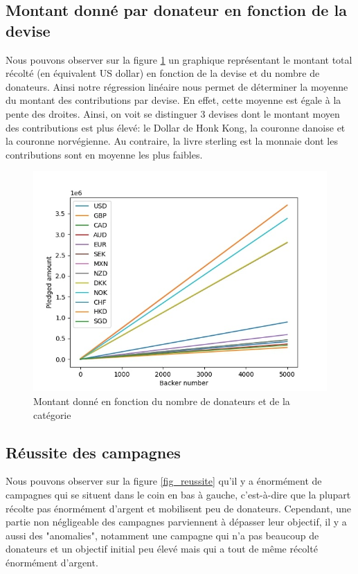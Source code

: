 \documentclass{article}
\begin{document}
\subsection{Montant donné par donateur en fonction de la devise}
\label{categorie}
\tabto{1cm} Nous pouvons observer sur la figure \ref{fig_devise} un graphique représentant le montant total récolté (en équivalent US dollar) en fonction de la devise et du nombre de donateurs. 
Ainsi notre régression linéaire nous permet de déterminer la moyenne du montant des contributions par devise. En effet, cette moyenne est égale à la pente des droites. Ainsi, on voit se distinguer 3 devises dont le montant moyen des contributions est plus élevé: 
le Dollar de Honk Kong, la couronne danoise et la couronne norvégienne. Au contraire, la livre sterling est la monnaie dont les contributions sont en moyenne les plus faibles.

\begin{figure}[htbp]
    \graphicspath{{graph/}} 
    \centerline{\includegraphics[scale=0.4]{currency_comparison.jpg}}
    \caption{Montant donné en fonction du nombre de donateurs et de la catégorie}
    \label{fig_devise}
\end{figure}

\newpage

\subsection{Réussite des campagnes}
\label{reussite}
\tabto{1cm} Nous pouvons observer sur la figure \ref{fig_reussite} qu'il y a énormément de campagnes qui se situent dans le coin en bas à gauche, c'est-à-dire que la plupart récolte pas énormément d'argent et mobilisent peu de donateurs.
Cependant, une partie non négligeable des campagnes parviennent à dépasser leur objectif, il y a aussi des "anomalies", notamment une campagne qui n'a pas beaucoup de donateurs et un objectif initial peu élevé mais qui a tout de même récolté énormément d'argent.
\end{document}
